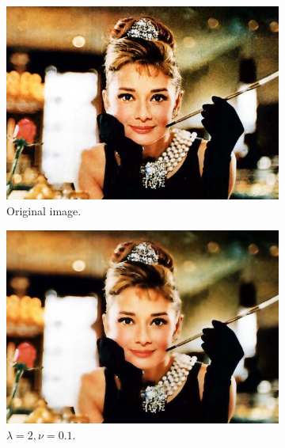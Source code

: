 \documentclass[abstracton]{scrreprt}
\begin{document}
            \begin{figure}[!ht]
                \centering
                \begin{subfigure}[b]{0.4\textwidth}
                    \includegraphics[width=\textwidth]{img/images/hepburn.png}
                    \caption{Original image.}
                \end{subfigure}
                \begin{subfigure}[b]{0.4\textwidth}
                    \includegraphics[width=\textwidth]{img/cartooning/bad_pws_hepburn.png}
                    \caption{$\lambda = 2, \nu = 0.1$.}
                \end{subfigure}
                \begin{subfigure}[b]{0.4\textwidth}

\end{subfigure}
\end{figure}
\end{document}
